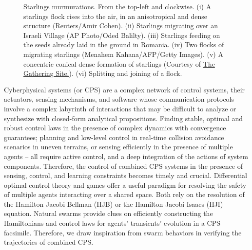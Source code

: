 \begin{figure}[tb!]
\begin{tabular}{ccc}
	\end{tabular}
	\caption{Starlings murmurations. From the top-left and clockwise. (i) A starlings flock rises into the air, in an anisotropical and dense structure (Reuters/Amir Cohen).  (ii) Starlings migrating over an Israeli Village (AP Photo/Oded Balilty). (iii) Starlings feeding on the seeds already laid in the ground in Romania. (iv) Two flocks of migrating starlings (Menahem Kahana/AFP/Getty Images). (v) A concentric conical dense formation of starlings (Courtesy of \href{http://www.thegatheringsite.net/qcgems/2014/1/24/murmuration}{The Gathering Site.}). (vi)  Splitting and joining of a flock.} 
	\label{fig:murmurations}
\end{figure}

\noindent
Cyberphysical systems (or CPS) are  a complex network of control systems, their actuators, sensing mechanisms, and software whose communication protocols involve a complex labyrinth of interactions that may be difficult to analyze or synthesize with closed-form analytical propositions.   Finding stable, optimal and robust control laws in the presence of complex dynamics with convergence guarantees; planning and low-level control in real-time collision avoidance scenarios in uneven terrains, or sensing efficiently in the presence of multiple agents -- all require active control, and a deep integration of the actions of system components. Therefore,  the control of combined CPS systems in the presence of sensing, control, and learning constraints becomes timely and crucial. Differential optimal control theory and games offer a useful paradigm for resolving the safety of multiple agents interacting over a shared space. Both rely on the resolution of the Hamilton-Jacobi-Bellman (HJB) or the Hamilton-Jacobi-Isaacs (HJI) equation.  Natural swarms provide clues on efficiently constructing the Hamiltonians and control laws for agents' transients' evolution in a CPS facsimile. Therefore, we draw inspiration from swarm behaviors in verifying the trajectories of combined CPS.

